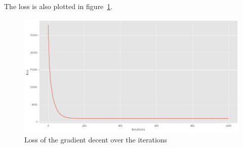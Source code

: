 The loss is also plotted in figure~\ref{problem4_result_loss}.

\begin{figure}[h]
	\centering
    \includegraphics[width=17cm]{img/problem4_result_loss.png}
    \caption{Loss of the gradient decent over the iterations}
    \label{problem4_result_loss}
\end{figure}

